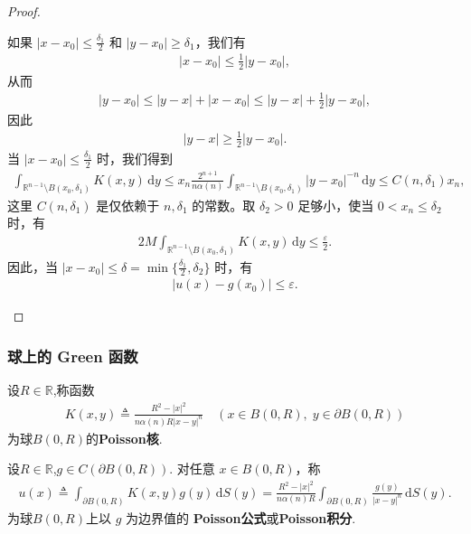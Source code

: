 \documentclass[../../main.tex]{subfiles}%
\begin{document}
\begin{proof}
\begin{enumerate}[(1)]
如果 $|x-x_0|\leqslant \frac{\delta_1}{2}$ 和 $|y-x_0|\geqslant \delta_1$，我们有
\begin{align*}
|x-x_0| \leqslant \frac{1}{2}|y-x_0|,
\end{align*}
从而
\begin{align*}
|y-x_0| \leqslant |y-x| + |x-x_0| \leqslant |y-x| + \frac{1}{2}|y-x_0|,
\end{align*}
因此
\begin{align*}
|y-x| \geqslant \frac{1}{2}|y-x_0|.
\end{align*}
当 $|x-x_0|\leqslant \frac{\delta_1}{2}$ 时，我们得到
\begin{align*}
\int_{\mathbb{R}^{n-1}\setminus B(x_0,\delta_1)} K(x,y)\,\mathrm{d}y
\leqslant x_n \frac{2^{n+1}}{n\alpha(n)} \int_{\mathbb{R}^{n-1}\setminus B(x_0,\delta_1)} |y-x_0|^{-n}\,\mathrm{d}y 
\leqslant C(n,\delta_1)x_n,
\end{align*}
这里 $C(n,\delta_1)$ 是仅依赖于 $n,\delta_1$ 的常数。取 $\delta_2>0$ 足够小，使当 $0<x_n\leqslant \delta_2$ 时，有
\begin{align*}
2M\int_{\mathbb{R}^{n-1}\setminus B(x_0,\delta_1)} K(x,y)\,\mathrm{d}y \leqslant \frac{\varepsilon}{2}.
\end{align*}
因此，当 $|x-x_0|\leqslant \delta = \min\{\frac{\delta_1}{2},\delta_2\}$ 时，有
\begin{align*}
|u(x)-g(x_0)| \leqslant \varepsilon.
\end{align*}
\end{enumerate}
\end{proof}

\subsubsection{球上的 Green 函数}

\begin{definition}
设$R\in \mathbb{R}$,称函数
\begin{align*}
K(x,y)\triangleq \frac{R^2-|x|^2}{n\alpha(n)R|x-y|^n}\quad (x\in B(0,R),\; y\in\partial B(0,R))
\end{align*}
为球$B(0,R)$的\textbf{Poisson核}.
\end{definition}

\begin{definition}
设$R\in \mathbb{R}$,$g\in C(\partial B(0,R))$. 对任意 $x\in B(0,R)$，称
\begin{align}\label{eq:poisson-ball}
u(x)\triangleq \int_{\partial B(0,R)} K(x,y)g(y)\,\mathrm{d}S(y)
=\frac{R^2-|x|^2}{n\alpha(n)R}\int_{\partial B(0,R)}\frac{g(y)}{|x-y|^n}\,\mathrm{d}S(y). 
\end{align}
为球$B(0,R)$上以 $g$ 为边界值的 \textbf{Poisson公式}或\textbf{Poisson积分}.
\end{definition}
\end{document}
